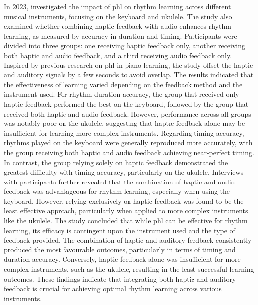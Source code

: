 In $2023$,  investigated the impact of \gls{phl} on rhythm learning across different musical instruments, focusing on the keyboard and ukulele. The study also examined whether combining haptic feedback with audio enhances rhythm learning, as measured by accuracy in duration and timing.
Participants were divided into three groups: one receiving haptic feedback only, another receiving both haptic and audio feedback, and a third receiving audio feedback only. Inspired by previous research on \gls{phl} in piano learning\cite{Donchev2021, Huang2010}, the study offset the haptic and auditory signals by a few seconds to avoid overlap. The results indicated that the effectiveness of learning varied depending on the feedback method and the instrument used. For rhythm duration accuracy, the group that received only haptic feedback performed the best on the keyboard, followed by the group that received both haptic and audio feedback. However, performance across all groups was notably poor on the ukulele, suggesting that haptic feedback alone may be insufficient for learning more complex instruments.
Regarding timing accuracy, rhythms played on the keyboard were generally reproduced more accurately, with the group receiving both haptic and audio feedback achieving near-perfect timing. In contrast, the group relying solely on haptic feedback demonstrated the greatest difficulty with timing accuracy, particularly on the ukulele. Interviews with participants further revealed that the combination of haptic and audio feedback was advantageous for rhythm learning, especially when using the keyboard. However, relying exclusively on haptic feedback was found to be the least effective approach, particularly when applied to more complex instruments like the ukulele. The study concluded that while \gls{phl} can be effective for rhythm learning, its efficacy is contingent upon the instrument used and the type of feedback provided. The combination of haptic and auditory feedback consistently produced the most favourable outcomes, particularly in terms of timing and duration accuracy. Conversely, haptic feedback alone was insufficient for more complex instruments, such as the ukulele, resulting in the least successful learning outcomes. These findings indicate that integrating both haptic and auditory feedback is crucial for achieving optimal rhythm learning across various instruments.

